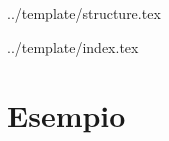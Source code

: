 


\def\DOCUMENTO{<Nome documento>}
\def\VERSIONE{1.0.0}

\def\DESCRIZIONE{<Info documento}

\def\REDATTORE {<Redattore>}
\def\VERIFICATORE {<Verificatore>}
\def\RESPONSABILE {<Responsabile>}

\def\USO {<Uso>}

\def\DISTRIBUZIONE {\GRUPPO{}\\ & \COMMITTENTE{}\\}

\def\DESCRIZIONE {<Descrizione>}


\def\INDICE	{true}
\def\TABELLE {true}
\def\FIGURE {true}


 {../template/structure.tex}


 {../template/index.tex}


\section{Esempio}






